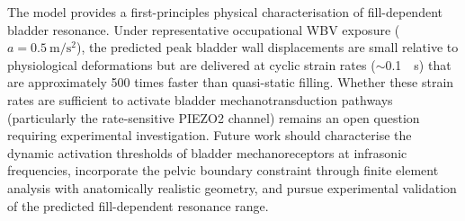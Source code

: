 The model provides a first-principles physical characterisation of
fill-dependent bladder resonance.  Under representative occupational WBV
exposure ($a = \SI{0.5}{\metre\per\second\squared}$), the predicted peak
bladder wall displacements are small relative to physiological deformations
but are delivered at cyclic strain rates ($\sim$\SI{0.1}{\per\second}) that
are approximately 500 times faster than quasi-static filling.  Whether these
strain rates are sufficient to activate bladder mechanotransduction pathways
(particularly the rate-sensitive PIEZO2 channel) remains an open question
requiring experimental investigation.  Future work should characterise the
dynamic activation thresholds of bladder mechanoreceptors at infrasonic
frequencies, incorporate the pelvic boundary constraint through finite
element analysis with anatomically realistic geometry, and pursue
experimental validation of the predicted fill-dependent resonance range.
